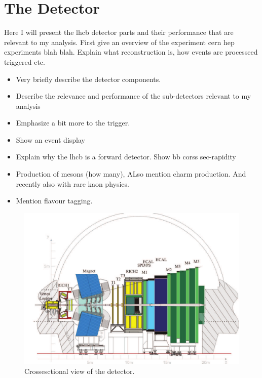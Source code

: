 

\chapter{The \lhcb Detector}
\label{lhcb_detector}

Here I will present the lhcb detector parts and their performance that are relevant to my analysis.
First give an overview of the experiment cern hep experiments blah blah. Explain what reconstruction
is, how events are processeed triggered etc.

\begin{itemize}
  \item Very briefly describe the detector components.
  \item Describe the relevance and performance of the sub-detectors relevant to my analysis
  \item Emphasize a bit more to the trigger.
  \item Show an event display
  \item Explain why the lhcb is a forward detector. Show bb corss sec-rapidity
  \item Production of \Bs mesons (how many), ALso mention charm production. And recently also with rare kaon physics.
  \item Mention flavour tagging.
\end{itemize}


\begin{figure}[t]
  \centering
  \includegraphics[width=\textwidth]{Figures/Chapter2/detector_cross_cmyk}
  \caption{Crossesctional view of the \lhcb detector.}
  \label{lhcb_detector_cross_section}
\end{figure}


